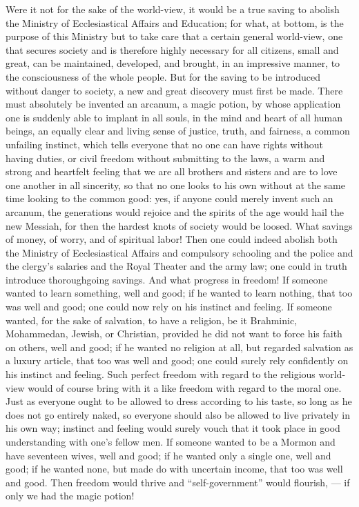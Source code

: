 \documentclass[12pt,a4paper,openany]{book}
\newcommand{\opage}[1]{\marginnote{\footnotesize\textit{[#1]}}}
\begin{document}
Were it not for the sake of the world-view,
it would be a true saving to abolish the Ministry of Ecclesiastical Affairs and Education;
for what, at bottom, is the purpose of this Ministry
\setcounter{footnote}{0}%
\opage{2}but to take care that a certain general world-view,
one that secures society and is therefore
highly necessary for all citizens, small and great,
can be maintained, developed, and brought, in an impressive
manner, to the consciousness of the whole people. But
for the saving to be introduced without danger to
society, a new and great discovery must first be made.
There must absolutely be invented an arcanum, a magic potion,
by whose application one is suddenly able
to implant in all souls, in the mind and heart of all human beings,
an equally clear and living sense of justice, truth,
and fairness, a common unfailing instinct, which tells
everyone that no one can have rights without having
duties, or civil freedom without submitting to the laws,
a warm and strong and heartfelt feeling that we are all
brothers and sisters and are to love one another in all sincerity,
so that no one looks to his own without at the same time
looking to the common good: yes, if anyone could merely
invent such an arcanum, the generations would rejoice
and the spirits of the age would hail the new Messiah, for then the
hardest knots of society would be loosed. What savings of
money, of worry, and of spiritual labor! Then one could
indeed abolish both the Ministry of Ecclesiastical Affairs and compulsory schooling
and the police and the clergy's salaries and the Royal
Theater and the army law; one could in truth introduce
thoroughgoing savings. And what progress in
freedom! If someone wanted to learn something, well and good; if he wanted to
learn nothing, that too was well and good; one could now rely on
his instinct and feeling. If someone wanted, for the sake of salvation,
to have a religion, be it Brahminic, Mohammedan,
Jewish, or Christian, provided he did not want to force
\setcounter{footnote}{0}%
\opage{3}his faith on others, well and good; if he wanted no religion
at all, but regarded salvation as a luxury article, that
too was well and good; one could surely rely confidently on his instinct
and feeling. Such perfect freedom
with regard to the religious world-view would of course
bring with it a like freedom with regard to the
moral one. Just as everyone ought to be allowed to dress
according to his taste, so long as he does not go entirely naked, so
everyone should also be allowed to live privately
in his own way; instinct and feeling would surely vouch
that it took place in good understanding with one's fellow men.
If someone wanted to be a Mormon and have seventeen wives, well and
good; if he wanted only a single one, well and good; if
he wanted none, but made do with uncertain income, that
too was well and good. Then freedom would thrive and ``self-government''
would flourish, --- if only we had the magic potion!
\end{document}
